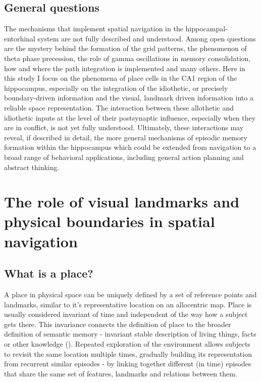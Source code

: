 \subsection{General questions}

The mechanisms that implement spatial navigation in the hippocampal-entorhinal system are not fully described and understood. Among open questions are the mystery behind the formation of the grid patterns, the phenomenon of theta phase precession, the role of gamma oscillations in memory consolidation, how and where the path integration is implemented and many others. Here in this study I focus on the phenomena of place cells in the CA1 region of the hippocampus, especially on the integration of the idiothetic, or precisely boundary-driven information and the visual, landmark driven information into a reliable space representation. The interaction between these allothetic and idiothetic inputs at the level of their postsynaptic influence, especially when they are in conflict, is not yet fully understood. Ultimately, these interactions may reveal, if described in detail, the more general mechanisms of episodic memory formation within the hippocampus which could be extended from navigation to a broad range of behavioral applications, including general action planning and abstract thinking.


\section[The role of visual landmarks and physical boundaries in spatial navigation]{The role of visual landmarks and physical boundaries in spatial navigation%
              }

\label{sec:role_of_landmarks}


\subsection{What is a place?}

A place in physical space can be uniquely defined by a set of reference points and landmarks, similar to it’s representative location on an allocentric map. Place is usually considered invariant of time and independent of the way how a subject gets there. This invariance connects the definition of place to the broader definition of semantic memory - invariant stable description of living things, facts or other knowledge (\cite{Buzsaki2013}). Repeated exploration of the environment allows subjects to revisit the same location multiple times, gradually building its representation from recurrent similar episodes - by linking together different (in time) episodes that share the same set of features, landmarks and relations between them.

